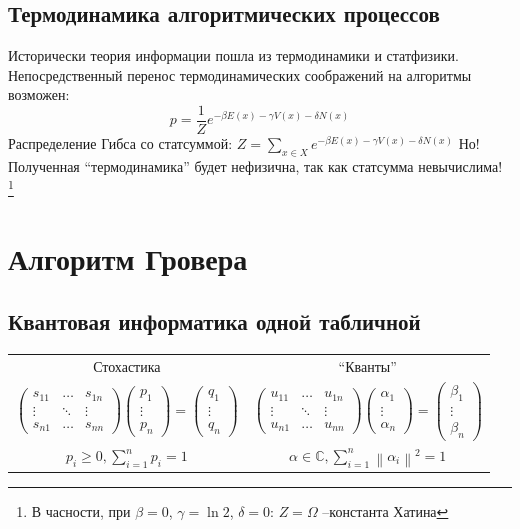 \documentclass[a0,portrait]{a0poster}
\begin{document}
\begin{multicols}{2}
\subsection{Термодинамика алгоритмических процессов}
Исторически теория информации пошла из термодинамики и статфизики. Непосредственный перенос термодинамических соображений на алгоритмы возможен:
\[
p = \frac{1}{Z} e^{-\beta E(x) -\gamma V(x) - \delta N(x)}
\]
Распределение Гибса со статсуммой: $Z = \sum_{x \in X} e^{-\beta E(x) -\gamma V(x) - \delta N(x)}$
Но! Полученная ``термодинамика'' будет нефизична, так как статсумма невычислима! \footnote{В часности, при $\beta = 0$,
$\gamma = \ln 2$, $\delta = 0$:  $Z = \Omega$ --константа Хатина  }


\section{Алгоритм Гровера}
\subsection{Квантовая информатика одной табличной}
\begin{center}
\begin{tabular}{c|c}
Стохастика & ``Кванты'' \\ 
$ \begin{pmatrix}
s_{11} & \dots &s_{1n}\\ 
\vdots & \ddots & \vdots \\ 
s_{n1} & \dots & s_{nn}
\end{pmatrix}
\begin{pmatrix}
p_1\\ 
\vdots \\ 
p_n
\end{pmatrix}
=
\begin{pmatrix}
q_1\\ 
\vdots \\ 
q_n
\end{pmatrix}$ &
$ \begin{pmatrix}
u_{11} & \dots & u_{1n}\\ 
\vdots & \ddots & \vdots \\ 
u_{n1} & \dots & u_{nn}
\end{pmatrix}
\begin{pmatrix}
\alpha_1\\ 
\vdots \\ 
\alpha_n
\end{pmatrix}
=
\begin{pmatrix}
\beta_1\\ 
\vdots \\ 
\beta_n
\end{pmatrix}$ \\
$ p_i \geq 0, \sum_{i=1}^{n} p_i =1 $ & $ \alpha \in \mathbb{C},  \sum_{i=1}^{n}\left \| \alpha_i \right \|^2 =1  $
\end{tabular}
\end{center}

\end{multicols}
\end{document}
